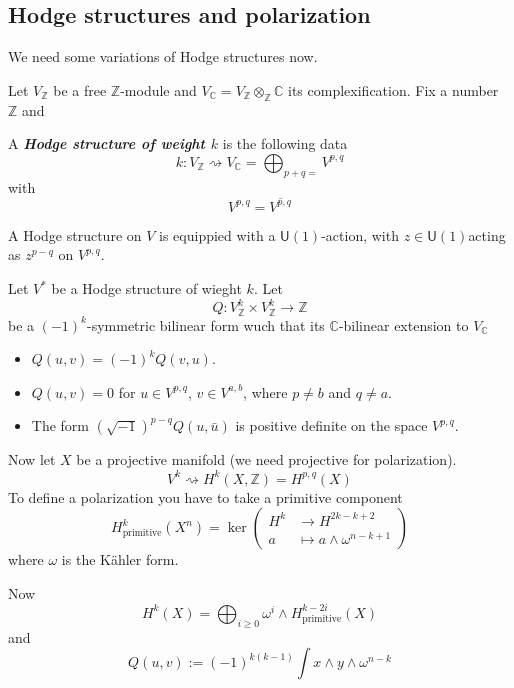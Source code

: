 \subsection{Hodge structures and polarization}

We need some variations of Hodge structures now.

Let $V_{\mathbb{Z}}$ be a free $\mathbb{Z}$-module and $V_{\mathbb{C}}=V_{\mathbb{Z}}\otimes_{\mathbb{Z}}\mathbb{C}$ its complexification. Fix a number $\mathbb{Z}$ and

\begin{defn}\leavevmode
	A \textit{\textbf{Hodge structure of weight $k$}} is the following data
	\[k:V_\mathbb{Z}\rightsquigarrow V_{\mathbb{C}}=\bigoplus_{p+q=}  V^{p,q}\]
	with
	\[V^{p,q}=\overline{V^{p,q}}\]
\end{defn}

A Hodge structure on $V$ is equippied with a $\mathsf{U}(1)$-action, with $z\in\mathsf{U}(1)$acting as $z^{p-q}$ on $V^{p,q}$.

\begin{defn}\leavevmode
	Let $V^*$ be a Hodge structure of wieght $k$. Let
	\[Q:V_\mathbb{Z}^k\times V_{\mathbb{Z}}^k\to  \mathbb{Z}\]
	be a $(-1)^{k}$-symmetric bilinear form wuch that its $\mathbb{C}$-bilinear extension to $V_\mathbb{C}$
	\begin{itemize}
	\item $Q(u,v)=(-1)^{k} Q(v,u)$.
	\item $Q(u,v)=0$ for  $u\in V^{p,q}$, $v\in V^{a,b}$, where $p\neq b$ and $q\neq a$.
	\item The form $(\sqrt{-1})^{p-q} Q(u,\bar{u})$ is positive definite on the space $V^{p,q}$.
	\end{itemize}
\end{defn}

Now let $X$ be a projective manifold (we need projective for polarization).
\[V^k\rightsquigarrow H^{k}(X,\mathbb{Z})=H^{p,q}(X)\]
To define a polarization you have to take a primitive component 
\[H^k_{\operatorname{pr i m i ti v e}}(X^n)=\ker\left( \begin{aligned}
	H^k  &\longrightarrow H^{2k-k+2} \\
	a &\longmapsto a\wedge \omega^{n-k+1}
\end{aligned} \right) \]
where $ \omega$ is the Kähler form.

Now
\[H^{k}(X)=\bigoplus_{i\geq 0} \omega^i\wedge H^{k-2i}_{\operatorname{primitive}}(X) \]
and
\[Q(u,v):=(-1)^{k(k-1)} \int x\wedge y\wedge \omega^{n-k}\]

